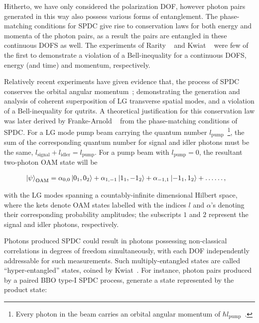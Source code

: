 \bigskip
\noindent
Hitherto, we have only considered the polarization \acs{DOF}, however photon pairs generated in this way also possess various forms of entanglement. The phase-matching conditions for \acs{SPDC} give rise to conservation laws for both energy and momenta of the photon pairs, as a result the pairs are entangled in these continuous \acs{DOFS} as well. The experiments of Rarity \etal~\cite{Rarity_1990} and Kwiat \etal~\cite{Kwiat_1993} were few of the first to demonstrate a violation of a Bell-inequality for a continuous \acs{DOFS}, energy (and time) and momentum, respectively. 


\clearpage
\noindent
Relatively recent experiments have given evidence that, the process of \acs{SPDC} conserves the orbital angular momentum~\cite{Mair_2001,Vaziri_2002}; demonstrating the generation and analysis of coherent superposition of \gls{LG} transverse spatial modes, and a violation of a Bell-inequality for qutrits. A theoretical justification for this conservation law was later derived by Franke-Arnold \etal~\cite{Franke-Arnold_2002} from the phase-matching conditions of \acs{SPDC}. For a \acs{LG} mode pump beam carrying the quantum number $l_\text{pump}$~\footnote{Every photon in the beam carries an orbital angular momentum of $\hbar l_\text{pump}$~\cite{Allen_1992}.}, the sum of the corresponding quantum number for signal and idler photons must be the same, \ie $l_\text{signal} + l_\text{idler} = l_\text{pump}$. For a pump beam with $l_\text{pump}=0$, the resultant two-photon \gls{OAM} state will be

\begin{align}
	\ket{\psi}_\text{OAM} &= \alpha_{0,0}\ket{0_1,0_2} + \alpha_{1,-1}\ket{1_1,-1_2} + \alpha_{-1, 1}\ket{-1_1, 1_2} + \ldots\ldots,
\end{align}

\noindent
with the \acs{LG} modes spanning a countably-infinite dimensional Hilbert space, where the kets denote \acs{OAM} states labelled with the indices $l$ and $\alpha$'s denoting their corresponding probability amplitudes; the subscripts $1$ and $2$ represent the signal and idler photons, respectively. 

\bigskip
\noindent
Photons produced \via \acs{SPDC} could result in photons possessing non-classical correlations in degrees of freedom simultaneously, with each \acs{DOF} independently addressable for such measurements. Such multiply-entangled states are called \enquote{hyper-entangled} states, coined by Kwiat~\cite{Kwiat_1997}. For instance, photon pairs produced by a paired \acs{BBO} type-I \acs{SPDC} process, generate a state represented by the product state:

